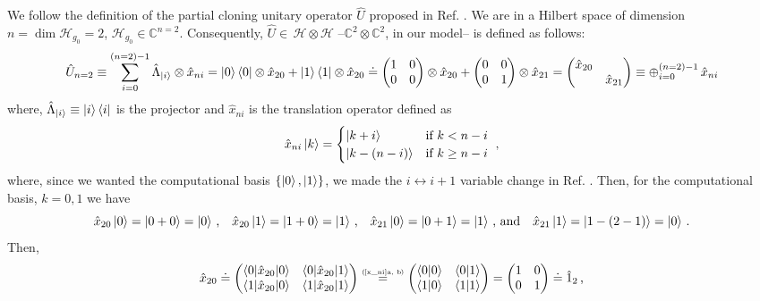 \documentclass[11pt]{article}
\numberwithin{equation}{section} %
\numberwithin{figure}{section} %
\newcommand\numeq[1] %
  {\stackrel{\scriptscriptstyle(\mkern-1.5mu#1\mkern-1.5mu)}{=}}
\begin{document}
We follow the definition of the partial cloning unitary operator $\hat{U}$ proposed in Ref. \cite[p.~2, Eq.~(5)]{Bio_Cloning}. We are in a Hilbert space of dimension $n=\dim \mathcal{H}_{g_0}=2$, $\mathcal{H}_{g_0}\in\mathbb{C}^{n=2}$. Consequently, $\hat{U}\in\,\mathcal{H}\otimes\mathcal{H}$ --$\mathbb{C}^{2}\otimes\mathbb{C}^{2}$, in our model-- is defined as follows:
\begin{equation} \label{why_U_CNOT}
\hat{U}_{n=2}\equiv\sum_{i=0}^{(n=2)-1}\hat{\Lambda}_{\ket{i}}\otimes \hat{x}_{ni}=\ket{0}\bra{0}\otimes\hat{x}_{20}+\ket{1}\bra{1}\otimes\hat{x}_{20}\doteq\begin{pmatrix}1&0\\0&0\end{pmatrix}\otimes\hat{x}_{20}+\begin{pmatrix}0&0\\0&1\end{pmatrix}\otimes\hat{x}_{21}=\begin{pmatrix}\hat{x}_{20}&\\&\hat{x}_{21}\end{pmatrix}\equiv\oplus_{i=0}^{(n=2)-1}\,\hat{x}_{ni}
\end{equation}
where, $\hat{\Lambda}_{\ket{i}}\equiv\ket{i}\bra{i}$ is the projector \cite[p.~2, Eq.~(4)]{Bio_Cloning} and $\hat{x}_{ni}$ is the translation operator defined as 
\begin{equation} \label{translation group}
\hat{x}_{ni}\ket{k}=
\begin{cases}
 \ket{k+i} & \text{if $k< n-i$}  \\
 \ket{k-(n-i)} & \text{if $k\geq n-i$}
 \end{cases}
 \,\,\textrm{,}
\end{equation} 
where, since we wanted the computational basis $\{\ket{0},\ket{1}\}$, we made the $i\leftrightarrow i+1$ variable change in Ref. \cite[p.~2, Eq.~(3)]{Bio_Cloning}. Then, for the computational basis, $k=0,1$ we have
\begin{equation} \label{x_ni}
\hat{x}_{20}\ket{0}=\ket{0+0}=\ket{0}\,\textrm{,}\quad\hat{x}_{20}\ket{1}=\ket{1+0}=\ket{1}\,\textrm{,}\quad\hat{x}_{21}\ket{0}=\ket{0+1}=\ket{1}\,\textrm{, and}\quad\hat{x}_{21}\ket{1}=\ket{1-(2-1)}=\ket{0}\,\textrm{.}
\end{equation}
Then,
\begin{equation} \label{x_20}
\hat{x}_{20}\doteq\begin{pmatrix}\braket{0|\hat{x}_{20}|0}&\braket{0|\hat{x}_{20}|1}\\\braket{1|\hat{x}_{20}|0}&\braket{1|\hat{x}_{20}|1}\end{pmatrix}\numeq{\textrm{\ref{x_ni}a, b}}\begin{pmatrix}\braket{0|0}&\braket{0|1}\\\braket{1|0}&\braket{1|1}\end{pmatrix}=\begin{pmatrix}1&0\\0&1\end{pmatrix}\doteq\hat{1}_2\,\textrm{,}
\end{equation}
\end{document}
